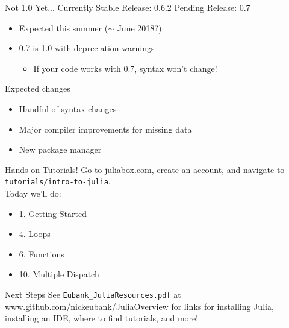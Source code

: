 \documentclass[11pt]{beamer}
\begin{document}
\begin{frame}[c]{Not 1.0 Yet...}
Currently Stable Release: 0.6.2
Pending Release: 0.7
\begin{itemize}
    \item Expected this summer ($\sim$ June 2018?)
    \item 0.7 is 1.0 with depreciation warnings
    \begin{itemize}
        \item If your code works with 0.7, syntax won't change!
    \end{itemize}
\end{itemize}
\end{frame}

\begin{frame}[c]{Expected changes}
\begin{itemize}
    \item Handful of syntax changes
    \item Major compiler improvements for missing data
    \item New package manager
\end{itemize}
\end{frame}

\begin{frame}[c]{Hands-on Tutorials!}
    Go to \url{juliabox.com}, create an account, and navigate to \texttt{tutorials/intro-to-julia}.\\
    Today we'll do:
    \begin{itemize}
        \item 1. Getting Started
        \item 4. Loops
        \item 6. Functions
        \item 10. Multiple Dispatch
    \end{itemize}
\end{frame}


\begin{frame}[c]{Next Steps}
 See \texttt{Eubank_JuliaResources.pdf} at \url{www.github.com/nickeubank/JuliaOverview} for links for installing Julia, installing an IDE, where to find tutorials, and more!
\end{frame}
\end{document}
